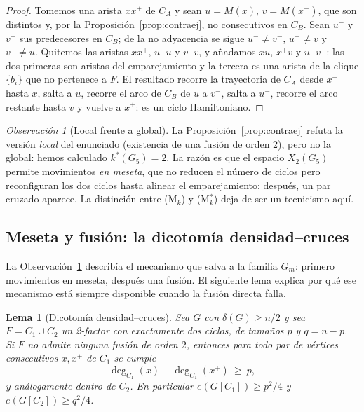 \documentclass[11pt,a4paper]{article}
\newtheorem{lema}[teorema]{Lema}
\theoremstyle{definition}
\theoremstyle{remark}
\newtheorem{observacion}[teorema]{Observación}
\begin{document}
\begin{proof}
Tomemos una arista $xx^+$ de $C_A$ y sean $u=M(x)$, $v=M(x^+)$, que son distintos y, por la Proposición~\ref{prop:contraej}, no consecutivos en $C_B$. Sean $u^-$ y $v^-$ sus predecesores en $C_B$; de la no adyacencia se sigue $u^-\neq v^-$, $u^-\neq v$ y $v^-\neq u$. Quitemos las aristas $xx^+$, $u^-u$ y $v^-v$, y añadamos $xu$, $x^+v$ y $u^-v^-$: las dos primeras son aristas del emparejamiento y la tercera es una arista de la clique $\{b_i\}$ que no pertenece a $F$. El resultado recorre la trayectoria de $C_A$ desde $x^+$ hasta $x$, salta a $u$, recorre el arco de $C_B$ de $u$ a $v^-$, salta a $u^-$, recorre el arco restante hasta $v$ y vuelve a $x^+$: es un ciclo Hamiltoniano.
\end{proof}

\begin{observacion}[Local frente a global]\label{obs:localglobal}
La Proposición~\ref{prop:contraej} refuta la versión \emph{local} del enunciado (existencia de una fusión de orden $2$), pero no la global: hemos calculado $k^*(G_5)=2$. La razón es que el espacio $X_2(G_5)$ permite movimientos \emph{en meseta}, que no reducen el número de ciclos pero reconfiguran los dos ciclos hasta alinear el emparejamiento; después, un par cruzado aparece. La distinción entre (M$_k$) y (M$^*_k$) deja de ser un tecnicismo aquí.
\end{observacion}

\subsection{Meseta y fusión: la dicotomía densidad--cruces}\label{sub:meseta}

La Observación~\ref{obs:localglobal} describía el mecanismo que salva a la familia $G_m$: primero movimientos en meseta, después una fusión. El siguiente lema explica por qué ese mecanismo está siempre disponible cuando la fusión directa falla.

\begin{lema}[Dicotomía densidad--cruces]\label{lem:dicotomia}
Sea $G$ con $\delta(G)\ge n/2$ y sea $F=C_1\cup C_2$ un 2-factor con exactamente dos ciclos, de tamaños $p$ y $q=n-p$. Si $F$ no admite ninguna fusión de orden $2$, entonces para todo par de vértices consecutivos $x,x^+$ de $C_1$ se cumple
\[
\deg_{C_1}(x)+\deg_{C_1}(x^+)\ \ge\ p ,
\]
y análogamente dentro de $C_2$. En particular $e(G[C_1])\ge p^2/4$ y $e(G[C_2])\ge q^2/4$.
\end{lema}
\end{document}
